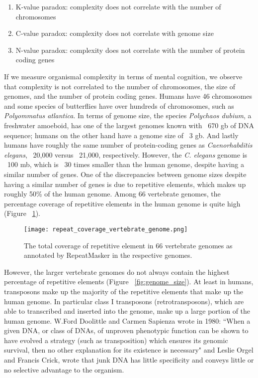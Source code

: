 \begin{enumerate}
   \item K-value paradox: complexity does not correlate with the number of chromosomes
   \item C-value paradox: complexity does not correlate with genome size
   \item N-value paradox: complexity does not correlate with the number of protein coding genes
\end{enumerate}

If we measure organismal complexity in terms of mental cognition, we observe that complexity is not correlated to the number of chromosomes, the size of genomes, and the number of protein coding genes. Humans have 46 chromosomes and some species of butterflies have over hundreds of chromosomes, such as \textit{Polyommatus atlantica}. In terms of genome size, the species \textit{Polychaos dubium}, a freshwater amoeboid, has one of the largest genomes known with ~670 gb of DNA sequence; humans on the other hand have a genome size of ~3 gb. And lastly humans have roughly the same number of protein-coding genes as \textit{Caenorhabditis elegans}, ~20,000 versus ~21,000, respectively. However, the \textit{C. elegans} genome is ~100 mb\cite{celegans1998sequencing}, which is ~30 times smaller than the human genome, despite having a similar number of genes. One of the discrepancies between genome sizes despite having a similar number of genes is due to repetitive elements, which makes up roughly 50\% of the human genome. Among 66 vertebrate genomes, the percentage coverage of repetitive elements in the human genome is quite high (Figure ~\ref{fig:repeat_coverage_vertebrate_genome}).

\begin{figure}[h]
   \centering
   \texttt{[image: repeat\_coverage\_vertebrate\_genome.png]}
   \caption[Coverage of repetitive elements in vertebrate genomes]{The total coverage of repetitive element in 66 vertebrate genomes as annotated by RepeatMasker in the respective genomes\cite{tang2014repcoverage}.}
   \label{fig:repeat_coverage_vertebrate_genome}
\end{figure}

However, the larger vertebrate genomes do not always contain the highest percentage of repetitive elements (Figure ~\ref{fig:genome_size}). At least in humans, transposons make up the majority of the repetitive elements that make up the human genome. In particular class I transposons (retrotransposons), which are able to transcribed and inserted into the genome, make up a large portion of the human genome. W.Ford Doolittle and Carmen Sapienza wrote in 1980\cite{doolittle1980selfish}: ``When a given DNA, or class of DNAs, of unproven phenotypic function can be shown to have evolved a strategy (such as transposition) which ensures its genomic survival, then no other explanation for its existence is necessary" and Leslie Orgel and Francis Crick, wrote that junk DNA has little specificity and conveys little or no selective advantage to the organism\cite{orgel1980selfish}.

